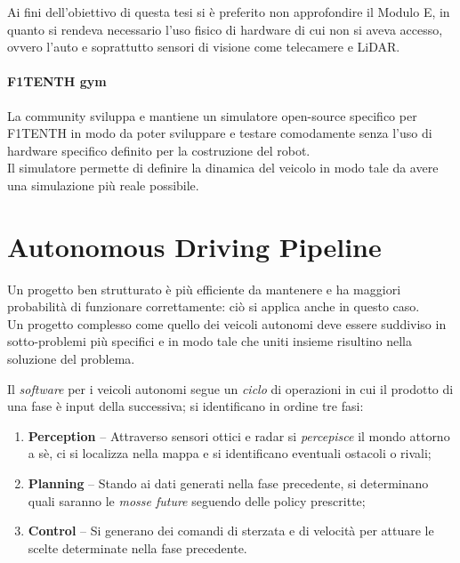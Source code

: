 \noindent Ai fini dell'obiettivo di questa tesi si è preferito non approfondire il Modulo E,
in quanto si rendeva necessario l'uso fisico di hardware di cui non si aveva accesso,
ovvero l'auto e soprattutto sensori di visione come telecamere e LiDAR.

\paragraph{F1TENTH gym}
\label{par:gym}
La community sviluppa e mantiene un simulatore open-source specifico per F1TENTH \cite{f1tenth-gym}
in modo da poter sviluppare e testare comodamente
senza l'uso di hardware specifico definito per la costruzione del robot.\\
Il simulatore permette di definire la dinamica del veicolo in modo tale da avere una simulazione
più reale possibile. 


\section{Autonomous Driving Pipeline}
\label{sec:pipeline}
Un progetto ben strutturato è più efficiente da mantenere e ha maggiori probabilità
di funzionare correttamente: ciò si applica anche in questo caso.\\
Un progetto complesso come quello dei veicoli autonomi deve essere suddiviso in sotto-problemi
più specifici e in modo tale che uniti insieme risultino nella soluzione del problema.

\bigskip
\noindent Il \emph{software} per i veicoli autonomi segue un \textit{ciclo} di operazioni
in cui il prodotto di una fase è input della successiva; si identificano in ordine tre fasi:
\begin{enumerate}
\item \textbf{Perception} -- Attraverso sensori ottici e radar si \emph{percepisce} il mondo attorno a sè,
	  ci si localizza nella mappa e si identificano eventuali ostacoli o rivali;
\item \textbf{Planning} -- Stando ai dati generati nella fase precedente,
	  si determinano quali saranno le \emph{mosse future} seguendo delle policy prescritte;
\item \textbf{Control} -- Si generano dei comandi di sterzata e di velocità per attuare le scelte
	  determinate nella fase precedente.
\end{enumerate}

